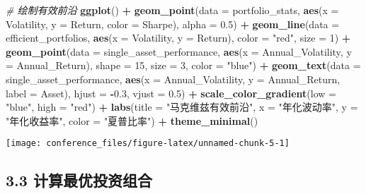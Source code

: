 \documentclass[
]{article}
\newenvironment{Shaded}{\begin{snugshade}}{\end{snugshade}}
\newcommand{\AttributeTok}[1]{\textcolor[rgb]{0.13,0.29,0.53}{#1}}
\newcommand{\CommentTok}[1]{\textcolor[rgb]{0.56,0.35,0.01}{\textit{#1}}}
\newcommand{\DecValTok}[1]{\textcolor[rgb]{0.00,0.00,0.81}{#1}}
\newcommand{\FloatTok}[1]{\textcolor[rgb]{0.00,0.00,0.81}{#1}}
\newcommand{\FunctionTok}[1]{\textcolor[rgb]{0.13,0.29,0.53}{\textbf{#1}}}
\newcommand{\NormalTok}[1]{#1}
\newcommand{\SpecialCharTok}[1]{\textcolor[rgb]{0.81,0.36,0.00}{\textbf{#1}}}
\newcommand{\StringTok}[1]{\textcolor[rgb]{0.31,0.60,0.02}{#1}}
\begin{document}
\begin{Shaded}
\begin{Highlighting}[]
\CommentTok{\# 绘制有效前沿}
\FunctionTok{ggplot}\NormalTok{() }\SpecialCharTok{+}
  \FunctionTok{geom\_point}\NormalTok{(}\AttributeTok{data =}\NormalTok{ portfolio\_stats, }\FunctionTok{aes}\NormalTok{(}\AttributeTok{x =}\NormalTok{ Volatility, }\AttributeTok{y =}\NormalTok{ Return, }\AttributeTok{color =}\NormalTok{ Sharpe), }\AttributeTok{alpha =} \FloatTok{0.5}\NormalTok{) }\SpecialCharTok{+}
  \FunctionTok{geom\_line}\NormalTok{(}\AttributeTok{data =}\NormalTok{ efficient\_portfolios, }\FunctionTok{aes}\NormalTok{(}\AttributeTok{x =}\NormalTok{ Volatility, }\AttributeTok{y =}\NormalTok{ Return), }\AttributeTok{color =} \StringTok{"red"}\NormalTok{, }\AttributeTok{size =} \DecValTok{1}\NormalTok{) }\SpecialCharTok{+}
  \FunctionTok{geom\_point}\NormalTok{(}\AttributeTok{data =}\NormalTok{ single\_asset\_performance, }\FunctionTok{aes}\NormalTok{(}\AttributeTok{x =}\NormalTok{ Annual\_Volatility, }\AttributeTok{y =}\NormalTok{ Annual\_Return), }
             \AttributeTok{shape =} \DecValTok{15}\NormalTok{, }\AttributeTok{size =} \DecValTok{3}\NormalTok{, }\AttributeTok{color =} \StringTok{"blue"}\NormalTok{) }\SpecialCharTok{+}
  \FunctionTok{geom\_text}\NormalTok{(}\AttributeTok{data =}\NormalTok{ single\_asset\_performance, }\FunctionTok{aes}\NormalTok{(}\AttributeTok{x =}\NormalTok{ Annual\_Volatility, }\AttributeTok{y =}\NormalTok{ Annual\_Return, }
                                                 \AttributeTok{label =}\NormalTok{ Asset), }\AttributeTok{hjust =} \SpecialCharTok{{-}}\FloatTok{0.3}\NormalTok{, }\AttributeTok{vjust =} \FloatTok{0.5}\NormalTok{) }\SpecialCharTok{+}
  \FunctionTok{scale\_color\_gradient}\NormalTok{(}\AttributeTok{low =} \StringTok{"blue"}\NormalTok{, }\AttributeTok{high =} \StringTok{"red"}\NormalTok{) }\SpecialCharTok{+}
  \FunctionTok{labs}\NormalTok{(}\AttributeTok{title =} \StringTok{"马克维兹有效前沿"}\NormalTok{,}
       \AttributeTok{x =} \StringTok{"年化波动率"}\NormalTok{,}
       \AttributeTok{y =} \StringTok{"年化收益率"}\NormalTok{,}
       \AttributeTok{color =} \StringTok{"夏普比率"}\NormalTok{) }\SpecialCharTok{+}
  \FunctionTok{theme\_minimal}\NormalTok{()}
\end{Highlighting}
\end{Shaded}

\begin{center}\texttt{[image: conference\_files/figure-latex/unnamed-chunk-5-1]} \end{center}

\subsection{3.3
计算最优投资组合}\label{ux8ba1ux7b97ux6700ux4f18ux6295ux8d44ux7ec4ux5408}
\end{document}
